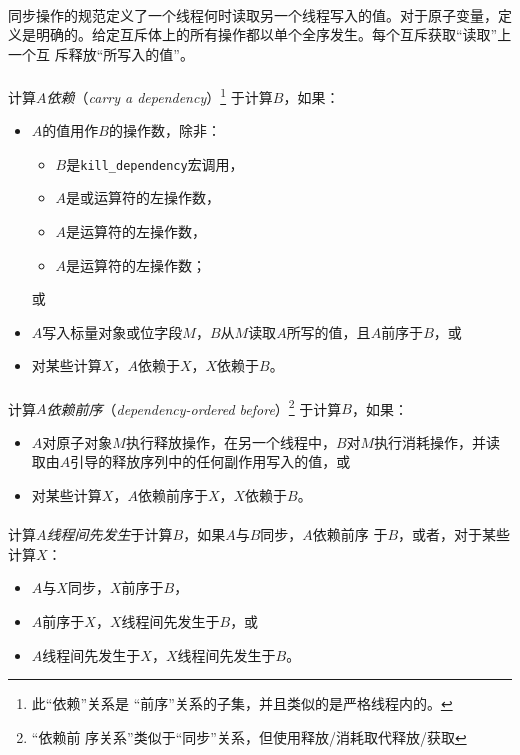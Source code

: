 \paragraph{}
\notes 同步操作的规范定义了一个线程何时读取另一个线程写入的值。对于原子变量，定
义是明确的。给定互斥体上的所有操作都以单个全序发生。每个互斥获取``读取''上一个互
斥释放``所写入的值''。

\paragraph{}
计算$A$\textit{依赖}（\textit{carry a dependency}）\footnote{此``依赖''关系是
``前序''关系的子集，并且类似的是严格线程内的。} 于计算$B$，如果：
\begin{itemize}
  \item{$A$的值用作$B$的操作数，除非：
    \begin{itemize}
      \item{$B$是\texttt{kill\_dependency}宏调用，}
      \item{$A$是\tm{\&\&}或\tm{||}运算符的左操作数，}
      \item{$A$是运算符的左操作数，}
      \item{$A$是\tm{,}运算符的左操作数；}
    \end{itemize}
    或}
  \item{$A$写入标量对象或位字段$M$，$B$从$M$读取$A$所写的值，且$A$前序于$B$，或}
  \item{对某些计算$X$，$A$依赖于$X$，$X$依赖于$B$。}
\end{itemize}

\paragraph{}
计算$A$\textit{依赖前序}（\textit{dependency-ordered before}）\footnote{``依赖前
序关系''类似于``同步''关系，但使用释放/消耗取代释放/获取} 于计算$B$，如果：
\begin{itemize}
  \item{$A$对原子对象$M$执行释放操作，在另一个线程中，$B$对$M$执行消耗操作，并读
    取由$A$引导的释放序列中的任何副作用写入的值，或}
  \item{对某些计算$X$，$A$依赖前序于$X$，$X$依赖于$B$。}
\end{itemize}

\paragraph{}
计算$A$\textit{线程间先发生}于计算$B$，如果$A$与$B$同步，$A$依赖前序
于$B$，或者，对于某些计算$X$：
\begin{itemize}
  \item{$A$与$X$同步，$X$前序于$B$，}
  \item{$A$前序于$X$，$X$线程间先发生于$B$，或}
  \item{$A$线程间先发生于$X$，$X$线程间先发生于$B$。}
\end{itemize}

